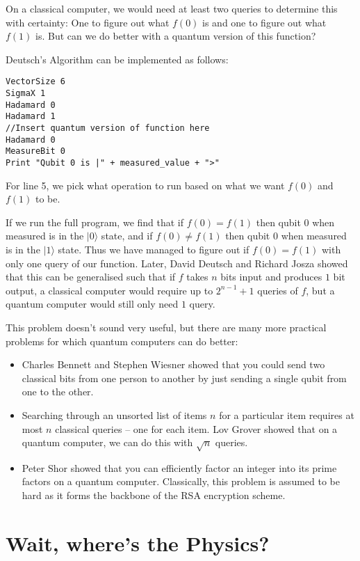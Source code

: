 \documentclass[twocolumn]{article}
\begin{document}
On a classical computer, we would need at least two queries to determine this with certainty: One to figure out what $f(0)$ is and one to figure out what $f(1)$ is. But can we do better with a quantum version of this function?

Deutsch's Algorithm can be implemented as follows:

\begin{lstlisting}
VectorSize 6
SigmaX 1
Hadamard 0
Hadamard 1
//Insert quantum version of function here
Hadamard 0
MeasureBit 0
Print "Qubit 0 is |" + measured_value + ">"
\end{lstlisting}

For line 5, we pick what operation to run based on what we want $f(0)$ and $f(1)$ to be.

If we run the full program, we find that if $f(0) = f(1)$ then qubit $0$ when measured is in the $|0\rangle$ state, and if $f(0) \neq f(1)$ then qubit $0$ when measured is in the $|1\rangle$ state. Thus we have managed to figure out if $f(0) = f(1)$ with only one query of our function. Later, David Deutsch and Richard Josza showed that this can be generalised such that if $f$ takes $n$ bits input and produces $1$ bit output, a classical computer would require up to $2^{n-1} + 1$ queries of $f$, but a quantum computer would still only need $1$ query.

This problem doesn't sound very useful, but there are many more practical problems for which quantum computers can do better:

\begin{itemize}
\item Charles Bennett and Stephen Wiesner showed that you could send two classical bits from one person to another by just sending a single qubit from one to the other.
\item Searching through an unsorted list of items $n$ for a particular item requires at most $n$ classical queries -- one for each item. Lov Grover showed that on a quantum computer, we can do this with $\sqrt{n}$ queries.
\item Peter Shor showed that you can efficiently factor an integer into its prime factors on a quantum computer. Classically, this problem is assumed to be hard as it forms the backbone of the RSA encryption scheme.
\end{itemize}

\section{Wait, where's the Physics?}
\end{document}
